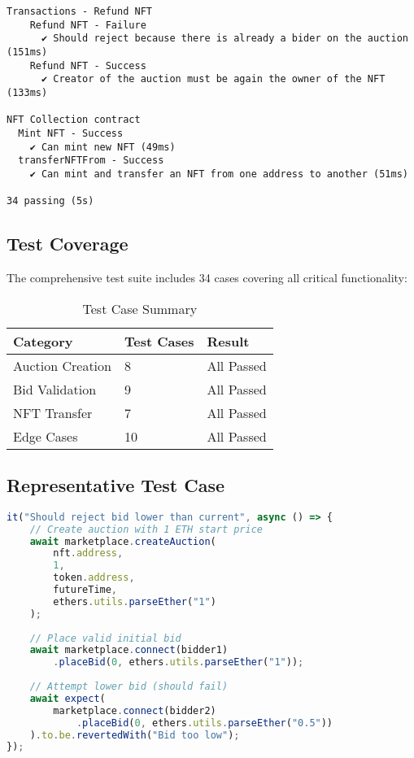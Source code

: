 \documentclass{article}
\begin{document}
\begin{lstlisting}[caption={Hardhat Test Results},basicstyle=\footnotesize\ttfamily]
  Transactions - Refund NFT
    Refund NFT - Failure
      ✔ Should reject because there is already a bider on the auction (151ms)
    Refund NFT - Success
      ✔ Creator of the auction must be again the owner of the NFT (133ms)

NFT Collection contract
  Mint NFT - Success
    ✔ Can mint new NFT (49ms)
  transferNFTFrom - Success
    ✔ Can mint and transfer an NFT from one address to another (51ms)

34 passing (5s)
\end{lstlisting}
\subsection{Test Coverage}
The comprehensive test suite includes 34 cases covering all critical functionality:

\begin{table}[h]
\centering
\begin{tabular}{lll}
\toprule
\textbf{Category} & \textbf{Test Cases} & \textbf{Result} \\
\midrule
Auction Creation & 8 & All Passed \\
Bid Validation & 9 & All Passed \\
NFT Transfer & 7 & All Passed \\
Edge Cases & 10 & All Passed \\
\bottomrule
\end{tabular}
\caption{Test Case Summary}
\end{table}

\subsection{Representative Test Case}
\begin{lstlisting}[language=JavaScript,caption={Bid Validation Test}]
it("Should reject bid lower than current", async () => {
    // Create auction with 1 ETH start price
    await marketplace.createAuction(
        nft.address, 
        1, 
        token.address, 
        futureTime, 
        ethers.utils.parseEther("1")
    );
    
    // Place valid initial bid
    await marketplace.connect(bidder1)
        .placeBid(0, ethers.utils.parseEther("1"));
    
    // Attempt lower bid (should fail)
    await expect(
        marketplace.connect(bidder2)
            .placeBid(0, ethers.utils.parseEther("0.5"))
    ).to.be.revertedWith("Bid too low");
});
\end{lstlisting}
\end{document}

